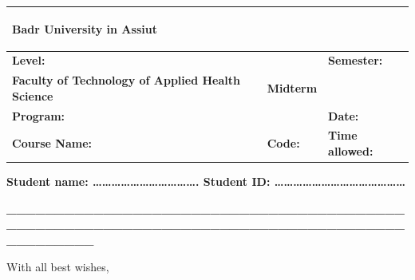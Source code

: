 \documentclass[11pt,a4paper]{article}
\begin{document}
\begin{figure}[h]
  \centering
\end{figure}

\begin{table}[h]
\centering
\begin{tabular}{|l|l|l|}
\hline
\begin{figure}[h]
  \centering
  \fbox{\parbox{0.5\textwidth}{}}
\end{figure}

\textbf{Badr University in Assiut} & \textbf{        } &  \\ \hline
\textbf{Level: } & \textbf{  } & \textbf{Semester:  } \\ \hline
\textbf{Faculty of Technology of Applied Health Science} & \textbf{Midterm } &  \\ \hline
\textbf{Program:  } &  & \textbf{Date: } \\ \hline
\textbf{Course Name:   } & \textbf{Code: } & \textbf{Time   allowed:  } \\ \hline
\end{tabular}
\end{table}

\textbf{Student name: \ldots{}\ldots{}\ldots{}\ldots{}\ldots{}\ldots{}\ldots{}\ldots{}\ldots{}\ldots{}\ldots{}.                   Student ID: \ldots{}\ldots{}\ldots{}\ldots{}\ldots{}\ldots{}\ldots{}\ldots{}\ldots{}\ldots{}\ldots{}\ldots{}\ldots{}\ldots{}}

\textbf{\_\_\_\_\_\_\_\_\_\_\_\_\_\_\_\_\_\_\_\_\_\_\_\_\_\_\_\_\_\_\_\_\_\_\_\_\_\_\_\_\_\_\_\_\_\_\_\_\_\_\_\_\_\_\_\_\_\_\_\_\_\_\_\_\_\_\_\_\_\_\_\_\_\_\_\_\_\_\_\_\_\_\_\_\_\_\_\_\_\_\_}

With all best wishes,
\end{document}
